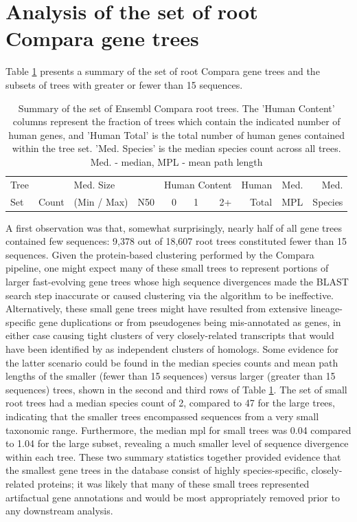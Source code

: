 \section{Analysis of the set of root Compara gene trees}
\label{section_root_compara_trees}

Table \ref{ensembl_root_table} presents a summary of the set of root
Compara gene trees and the subsets of trees with greater or fewer than
15 sequences.

\begin{table} \footnotesize
\centering
\begin{tabular}{lrb{2cm}rrrrrrr}
\toprule
Tree & &  Med. Size &  & \multicolumn{3}{c}{Human Content} & Human & Med. & Med. \\ \cmidrule(r){5-7}
Set & Count  & (Min / Max) & N50 & 0 & 1 & 2+ & Total & MPL & Species \\ 
  \midrule

   \bottomrule
\end{tabular}
\caption{Summary of the set of Ensembl Compara root trees. The 'Human
  Content' columns represent the fraction of trees which contain the
  indicated number of human genes, and 'Human Total' is the total
  number of human genes contained within the tree set. 'Med. Species'
  is the median species count across all trees. Med. - median, MPL -
  mean path length }
\label{ensembl_root_table}
\end{table}

A first observation was that, somewhat surprisingly, nearly half of
all \cmp gene trees contained few sequences: 9,378 out of 18,607 root
trees constituted fewer than 15 sequences. Given the protein-based
clustering performed by the Compara pipeline, one might expect many of
these small trees to represent portions of larger fast-evolving gene
trees whose high sequence divergences made the BLAST search step
inaccurate or caused clustering via the \hclust algorithm to be
ineffective. Alternatively, these small gene trees might have resulted
from extensive lineage-specific gene duplications or from pseudogenes
being mis-annotated as genes, in either case causing tight clusters of
very closely-related transcripts that would have been identified by
\hclust as independent clusters of homologs. Some evidence for the
latter scenario could be found in the median species counts and mean
path lengths of the smaller (fewer than 15 sequences) versus larger
(greater than 15 sequences) trees, shown in the second and third rows
of Table \ref{ensembl_root_table}. The set of small root trees had a
median species count of 2, compared to 47 for the large trees,
indicating that the smaller trees encompassed sequences from a very
small taxonomic range. Furthermore, the median \ac{mpl} for small
trees was 0.04 compared to 1.04 for the large subset, revealing a much
smaller level of sequence divergence within each tree. These two
summary statistics together provided evidence that the smallest gene
trees in the \cmp database consist of highly species-specific,
closely-related proteins; it was likely that many of these small trees
represented artifactual gene annotations and would be most
appropriately removed prior to any downstream analysis.

